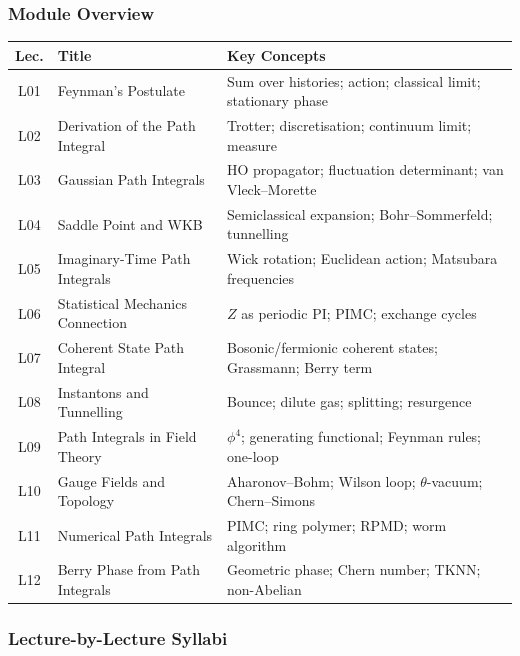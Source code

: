 \documentclass[11pt,a4paper]{article}
\begin{document}
\subsubsection*{Module Overview}
\begin{center}
\begin{tabularx}{\textwidth}{clX}
\toprule
\textbf{Lec.} & \textbf{Title} & \textbf{Key Concepts}\\
\midrule
L01 & Feynman's Postulate & Sum over histories; action; classical limit; stationary phase\\
L02 & Derivation of the Path Integral & Trotter; discretisation; continuum limit; measure\\
L03 & Gaussian Path Integrals & HO propagator; fluctuation determinant; van Vleck--Morette\\
L04 & Saddle Point and WKB & Semiclassical expansion; Bohr--Sommerfeld; tunnelling\\
L05 & Imaginary-Time Path Integrals & Wick rotation; Euclidean action; Matsubara frequencies\\
L06 & Statistical Mechanics Connection & $Z$ as periodic PI; PIMC; exchange cycles\\
L07 & Coherent State Path Integral & Bosonic/fermionic coherent states; Grassmann; Berry term\\
L08 & Instantons and Tunnelling & Bounce; dilute gas; splitting; resurgence\\
L09 & Path Integrals in Field Theory & $\phi^4$; generating functional; Feynman rules; one-loop\\
L10 & Gauge Fields and Topology & Aharonov--Bohm; Wilson loop; $\theta$-vacuum; Chern--Simons\\
L11 & Numerical Path Integrals & PIMC; ring polymer; RPMD; worm algorithm\\
L12 & Berry Phase from Path Integrals & Geometric phase; Chern number; TKNN; non-Abelian\\
\bottomrule
\end{tabularx}
\end{center}

\subsubsection*{Lecture-by-Lecture Syllabi}
\end{document}
